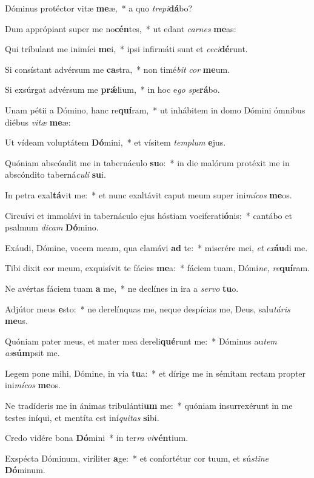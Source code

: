\item Dóminus protéctor vitæ \textbf{me}æ,~* a quo \textit{trepi}\textbf{dá}bo?
\item Dum apprópiant super me no\textbf{cén}tes,~* ut edant \textit{carnes} \textbf{me}as:
\item Qui tríbulant me inimíci \textbf{me}i,~* ipsi infirmáti sunt et \textit{ceci}\textbf{dé}runt.
\item Si consístant advérsum me \textbf{ca}stra,~* non timé\tinyhspace\textit{bit} \textit{cor} \textbf{me}um.
\item Si exsúrgat advérsum me \textbf{prǽ}lium,~* in hoc e\tinyhspace\textit{go} \textit{spe}\textbf{rá}bo.
\item Unam pétii a Dómino, hanc re\textbf{quí}ram,~* ut inhábitem in domo Dómini ómnibus diébus \textit{vitæ} \textbf{me}æ:
\item Ut vídeam voluptátem \textbf{Dó}mini,~* et vísitem \textit{templum} \textbf{e}jus.
\item Quóniam abscóndit me in tabernáculo \textbf{su}o:~* in die malórum protéxit me in abscóndito taberná\tinyhspace\textit{culi} \textbf{su}i.
\item In petra exal\textbf{tá}vit me:~* et nunc exaltávit caput meum super ini\textit{mícos} \textbf{me}os.
\item Circuívi et immolávi in tabernáculo ejus hóstiam vociferati\textbf{ó}nis:~* cantábo et psalmum \textit{dicam} \textbf{Dó}mino.
\item Exáudi, Dómine, vocem meam, qua clamávi \textbf{ad} te:~* miserére mei, \textit{et} \textit{ex}\textbf{áu}di me.
\item Tibi dixit cor meum, exquisívit te fácies \textbf{me}a:~* fáciem tuam, Dómi\textit{ne,} \textit{re}\textbf{quí}ram.
\item Ne avértas fáciem tuam \textbf{a} me,~* ne declínes in ira a \textit{servo} \textbf{tu}o.
\item Adjútor meus \textbf{e}sto:~* ne derelínquas me, neque despícias me, Deus, salu\tinyhspace\textit{táris} \textbf{me}us.
\item Quóniam pater meus, et mater mea dereli\textbf{qué}runt me:~* Dóminus au\tinyhspace\textit{tem} \textit{as}\textbf{súm}psit me.
\item Legem pone mihi, Dómine, in via \textbf{tu}a:~* et dírige me in sémitam rectam propter ini\textit{mícos} \textbf{me}os.
\item Ne tradíderis me in ánimas tribulánti\textbf{um} me:~* quóniam insurrexérunt in me testes iníqui, et mentíta est iní\tinyhspace\textit{quitas} \textbf{si}bi.
\item Credo vidére bona \textbf{Dó}mini~* in ter\textit{ra} \textit{vi}\textbf{vén}tium.
\item Exspécta Dóminum, viríliter \textbf{a}ge:~* et confortétur cor tuum, et sú\spurhspace\textit{stine} \textbf{Dó}minum.
